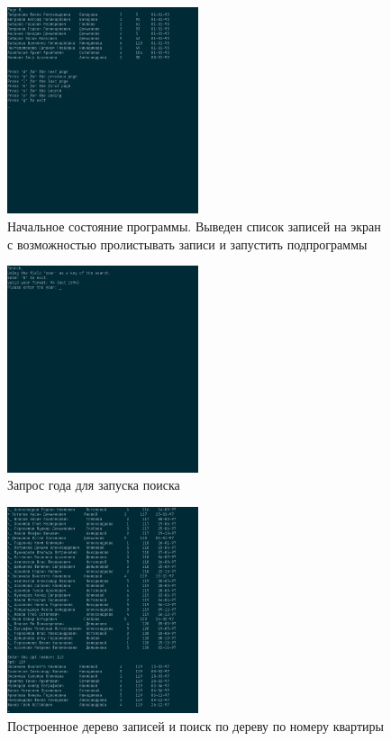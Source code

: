 \documentclass[fleqn]{article}
\begin{document}
\begin{figure}[h!]
	\includegraphics[width=0.5\textwidth]{screen1}
	\caption{Начальное состояние программы. Выведен список записей на экран с возможностью пролистывать записи и запустить подпрограммы}
\end{figure}

\begin{figure}[h!]
	\includegraphics[width=0.5\textwidth]{screen10}
	\caption{Запрос года для запуска поиска}
\end{figure}

\begin{figure}[h!]
	\includegraphics[width=0.5\textwidth]{screen2}
	\caption{Построенное дерево записей и поиск по дереву по номеру квартиры}
\end{figure}
\end{document}
